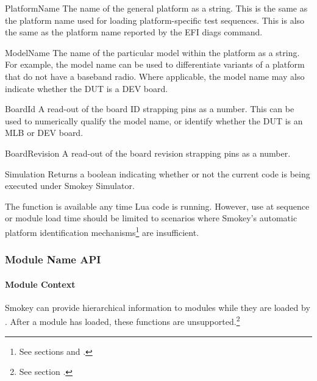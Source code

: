 \begin{Definition}

	\item[PlatformName] The name of the general platform as a string.  This
	is the same as the platform name used for loading platform-specific
	test sequences.  This is also the same as the platform name reported by
	the EFI diags  command.

	\item[ModelName] The name of the particular model within the platform
	as a string.  For example, the model name can be used to differentiate
	variants of a platform that do not have a baseband radio.  Where
	applicable, the model name may also indicate whether the DUT is a DEV
	board.

	\item[BoardId] A read-out of the board ID strapping pins as a number.
	This can be used to numerically qualify the model name, or identify
	whether the DUT is an MLB or DEV board.

	\item[BoardRevision] A read-out of the board revision strapping pins as
	a number.

	\item[Simulation] Returns a boolean indicating whether or not the
	current code is being executed under Smokey Simulator.

\end{Definition}

The  function is available any time Lua code is running.
However, use at sequence or module load time should be limited to scenarios
where Smokey's automatic platform identification mechanisms\footnote{See
sections  and
.} are insufficient.

\subsubsection{Module Name API}
\label{sec:ModuleNameApi}

\paragraph{Module Context}

Smokey can provide hierarchical information to modules while they are loaded by
.  After a module has loaded, these functions are
unsupported.\footnote{See section .}

